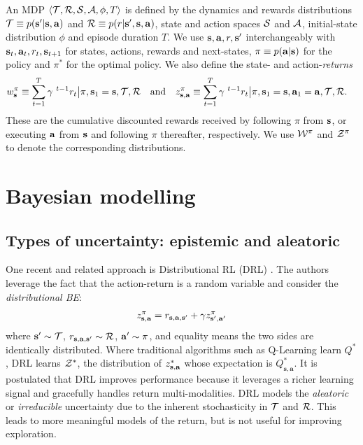 \documentclass{article}
\begin{document}
An MDP $\langle \mathcal{T}, \mathcal{R}, \mathcal{S}, \mathcal{A}, \phi, T \rangle$ is defined by the dynamics and rewards distributions $\mathcal{T} \equiv p(\mathbf{s}' | \mathbf{s}, \mathbf{a})$ and $\mathcal{R} \equiv p(r | \mathbf{s}', \mathbf{s}, \mathbf{a})$, state and action spaces $\mathcal{S}$ and $\mathcal{A}$, initial-state distribution $\phi$ and episode duration $T$. We use $\mathbf{s}, \mathbf{a}, r, \mathbf{s}'$ interchangeably with $\mathbf{s}_t, \mathbf{a}_t, r_t, \mathbf{s}_{t+1}$ for states, actions, rewards and next-states, $\pi \equiv p(\mathbf{a} | \mathbf{s})$ for the policy and $\pi^*$ for the optimal policy. We also define the state- and action-\textit{returns}
\begin{align}
w^\pi_{\mathbf{s}} \equiv \sum_{t = 1}^T \gamma^{~t - 1} r_t \big| \pi, \mathbf{s}_1 = \mathbf{s}, \mathcal{T}, \mathcal{R} ~~\text{ and }~~z^\pi_{\mathbf{s}, \mathbf{a}} &\equiv \sum_{t = 1}^T \gamma^{~t - 1} r_t \big| \pi, \mathbf{s}_1 = \mathbf{s}, \mathbf{a}_1 = \mathbf{a}, \mathcal{T}, \mathcal{R}.
\end{align}
These are the cumulative discounted rewards received by following $\pi$ from $\mathbf{s}$, or executing $\mathbf{a}$ from $\mathbf{s}$ and following $\pi$ thereafter, respectively. We use $\mathcal{W}^\pi$ and $\mathcal{Z}^\pi$ to denote the corresponding distributions.

\section{Bayesian modelling}

\subsection{Types of uncertainty: epistemic and aleatoric}

One recent and related approach is Distributional RL (DRL) \citep{distperrl}. The authors leverage the fact that the action-return is a random variable and consider the \textit{distributional BE}:
\begin{align} \label{eq:distributional}
z^\pi_{\mathbf{s}, \mathbf{a}} = r_{\mathbf{s}, \mathbf{a}, \mathbf{s}'} + \gamma z^\pi_{\mathbf{s}', \mathbf{a}'}
\end{align}
where $\mathbf{s}' \sim \mathcal{T}$, $r_{\mathbf{s}, \mathbf{a}, \mathbf{s}'} \sim \mathcal{R}$, $\mathbf{a}' \sim \pi$, and equality means the two sides are identically distributed. Where traditional algorithms such as Q-Learning \citep{qlearning} learn $Q^*$, DRL learns $\mathcal{Z}^*$, the distribution of $z^*_{\mathbf{s}, \mathbf{a}}$ whose expectation is $Q^*_{\mathbf{s}, \mathbf{a}}$. It is postulated that DRL improves performance because it leverages a richer learning signal and gracefully handles return multi-modalities. DRL models the \textit{aleatoric} or \textit{irreducible} uncertainty due to the inherent stochasticity in $\mathcal{T}$ and $\mathcal{R}$. This leads to more meaningful models of the return, but is not useful for improving exploration.
\end{document}

